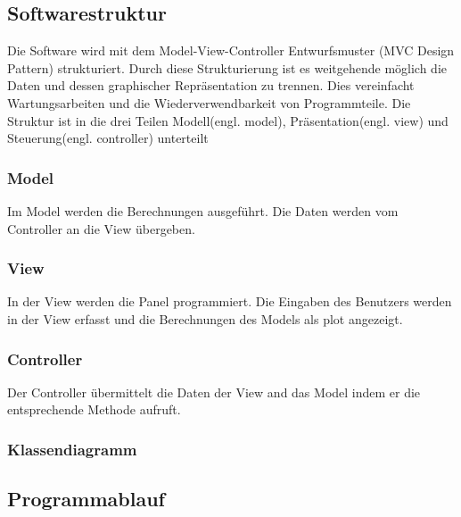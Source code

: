 \subsection{Softwarestruktur} \label{subsec:softwarestruktur}

Die Software wird mit dem Model-View-Controller Entwurfsmuster (MVC Design Pattern) \cite{MVCDesignPattern} strukturiert. Durch diese Strukturierung ist es weitgehende möglich die Daten und dessen graphischer Repräsentation zu trennen. Dies vereinfacht Wartungsarbeiten und die Wiederverwendbarkeit von Programmteile. Die Struktur ist in die drei Teilen Modell(engl. model), Präsentation(engl. view) und Steuerung(engl. controller) unterteilt

\subsubsection{Model} \label{subsubsec:model}

Im Model werden die Berechnungen ausgeführt. Die Daten werden vom Controller an die View übergeben. 

\subsubsection{View} \label{subsubsec:model}

In der View werden die Panel programmiert. Die Eingaben des Benutzers werden in der View erfasst und die Berechnungen des Models als plot angezeigt.

\subsubsection{Controller} \label{subsubsec:model}

Der Controller übermittelt die Daten der View and das Model indem er die entsprechende Methode aufruft. 

\subsubsection{Klassendiagramm} \label{subsubsec:model}



\subsection{Programmablauf} \label{subsec:programmablauf}

